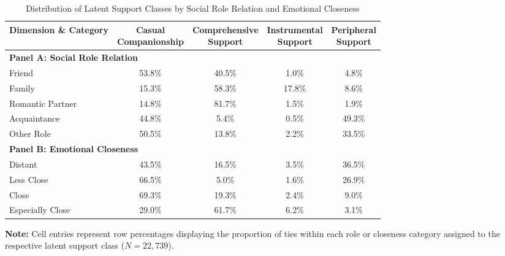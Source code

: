 \documentclass[12pt]{article}
\begin{document}
\begin{table}[htbp]
\centering
\caption{Distribution of Latent Support Classes by Social Role Relation and Emotional Closeness}
\label{tab:lca_crosstabs}
\begin{tabular*}{\textwidth}{@{\extracolsep{\fill}}lcccc@{}}
\toprule
Dimension \& Category & \shortstack{Casual\\Companionship} & \shortstack{Comprehensive\\Support} & \shortstack{Instrumental\\Support} & \shortstack{Peripheral\\Support} \\
\midrule
\multicolumn{5}{l}{\textbf{Panel A: Social Role Relation}} \\
\hspace{1em}Friend & 53.8\% & 40.5\% & 1.0\% & 4.8\% \\
\hspace{1em}Family & 15.3\% & 58.3\% & 17.8\% & 8.6\% \\
\hspace{1em}Romantic Partner & 14.8\% & 81.7\% & 1.5\% & 1.9\% \\
\hspace{1em}Acquaintance & 44.8\% & 5.4\% & 0.5\% & 49.3\% \\
\hspace{1em}Other Role & 50.5\% & 13.8\% & 2.2\% & 33.5\% \\
\midrule
\multicolumn{5}{l}{\textbf{Panel B: Emotional Closeness}} \\
\hspace{1em}Distant & 43.5\% & 16.5\% & 3.5\% & 36.5\% \\
\hspace{1em}Less Close & 66.5\% & 5.0\% & 1.6\% & 26.9\% \\
\hspace{1em}Close & 69.3\% & 19.3\% & 2.4\% & 9.0\% \\
\hspace{1em}Especially Close & 29.0\% & 61.7\% & 6.2\% & 3.1\% \\
\bottomrule
\end{tabular*}
\vspace{0.5em}
\parbox{\textwidth}{\footnotesize \textbf{Note:} Cell entries represent row percentages displaying the proportion of ties within each role or closeness category assigned to the respective latent support class ($N = 22,739$).}
\end{table}
\end{document}
